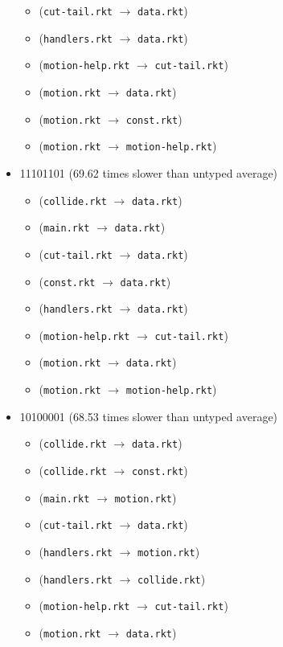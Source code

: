 \documentclass{article}
\newcommand{\mono}[1]{\texttt{#1}}
\begin{document}
\begin{itemize}
\begin{itemize}
  \item (\mono{cut-tail.rkt} $\rightarrow$ \mono{data.rkt})
  \item (\mono{handlers.rkt} $\rightarrow$ \mono{data.rkt})
  \item (\mono{motion-help.rkt} $\rightarrow$ \mono{cut-tail.rkt})
  \item (\mono{motion.rkt} $\rightarrow$ \mono{data.rkt})
  \item (\mono{motion.rkt} $\rightarrow$ \mono{const.rkt})
  \item (\mono{motion.rkt} $\rightarrow$ \mono{motion-help.rkt})
  \end{itemize}
\item 11101101 (69.62 times slower than untyped average)
  \begin{itemize}
  \item (\mono{collide.rkt} $\rightarrow$ \mono{data.rkt})
  \item (\mono{main.rkt} $\rightarrow$ \mono{data.rkt})
  \item (\mono{cut-tail.rkt} $\rightarrow$ \mono{data.rkt})
  \item (\mono{const.rkt} $\rightarrow$ \mono{data.rkt})
  \item (\mono{handlers.rkt} $\rightarrow$ \mono{data.rkt})
  \item (\mono{motion-help.rkt} $\rightarrow$ \mono{cut-tail.rkt})
  \item (\mono{motion.rkt} $\rightarrow$ \mono{data.rkt})
  \item (\mono{motion.rkt} $\rightarrow$ \mono{motion-help.rkt})
  \end{itemize}
\item 10100001 (68.53 times slower than untyped average)
  \begin{itemize}
  \item (\mono{collide.rkt} $\rightarrow$ \mono{data.rkt})
  \item (\mono{collide.rkt} $\rightarrow$ \mono{const.rkt})
  \item (\mono{main.rkt} $\rightarrow$ \mono{motion.rkt})
  \item (\mono{cut-tail.rkt} $\rightarrow$ \mono{data.rkt})
  \item (\mono{handlers.rkt} $\rightarrow$ \mono{motion.rkt})
  \item (\mono{handlers.rkt} $\rightarrow$ \mono{collide.rkt})
  \item (\mono{motion-help.rkt} $\rightarrow$ \mono{cut-tail.rkt})
  \item (\mono{motion.rkt} $\rightarrow$ \mono{data.rkt})

\end{itemize}
\end{itemize}
\end{document}

